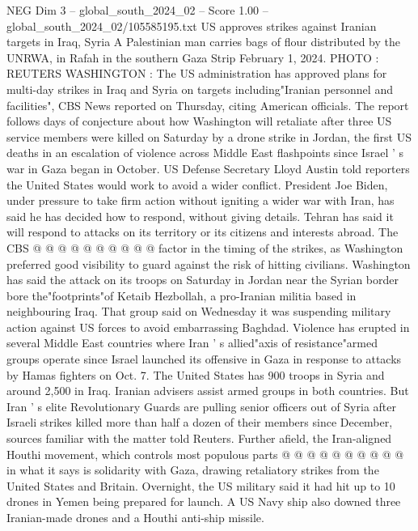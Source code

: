 \begin{textsample}{NEG Dim 3 – global\_south\_2024\_02 – Score 1.00 – global\_south\_2024\_02/105585195.txt}  \label{ex:f3_neg_094}
US approves strikes against Iranian targets in Iraq, Syria A Palestinian man carries bags of flour distributed by the UNRWA, in Rafah in the southern Gaza Strip February 1, 2024.
PHOTO : REUTERS WASHINGTON : The US administration has approved plans for multi-day strikes in Iraq and Syria on targets including"Iranian personnel and facilities", CBS News reported on Thursday, citing American officials.
The report follows days of conjecture about how Washington will retaliate after three US service members were killed on Saturday by a drone strike in Jordan, the first US deaths in an escalation of violence across Middle East flashpoints since Israel ' s war in Gaza began in October.
US Defense Secretary Lloyd Austin told reporters the United States would work to avoid a wider conflict.
President Joe Biden, under pressure to take firm action without igniting a wider war with Iran, has said he has decided how to respond, without giving details.
Tehran has said it will respond to attacks on its territory or its citizens and interests abroad.
The CBS @ @ @ @ @ @ @ @ @ @ factor in the timing of the strikes, as Washington preferred good visibility to guard against the risk of hitting civilians.
Washington has said the attack on its troops on Saturday in Jordan near the Syrian border bore the"footprints"of Ketaib Hezbollah, a pro-Iranian militia based in neighbouring Iraq.
That group said on Wednesday it was suspending military action against US forces to avoid embarrassing Baghdad.
Violence has erupted in several Middle East countries where Iran ' s allied"axis of resistance"armed groups operate since Israel launched its offensive in Gaza in response to attacks by Hamas fighters on Oct. 7.
The United States has 900 troops in Syria and around 2,500 in Iraq.
Iranian advisers assist armed groups in both countries.
But Iran ' s elite Revolutionary Guards are pulling senior officers out of Syria after Israeli strikes killed more than half a dozen of their members since December, sources familiar with the matter told Reuters.
Further afield, the Iran-aligned Houthi movement, which controls most populous parts @ @ @ @ @ @ @ @ @ @ in what it says is solidarity with Gaza, drawing retaliatory strikes from the United States and Britain.
Overnight, the US military said it had hit up to 10 drones in Yemen being prepared for launch.
A US Navy ship also downed three Iranian-made drones and a Houthi anti-ship missile.

\end{textsample}
